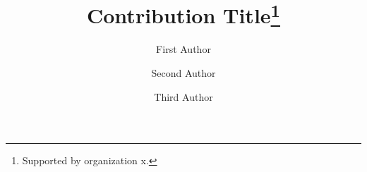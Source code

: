\documentclass[runningheads]{etc/llncs/llncs}
\begin{document}
\title{Contribution Title\thanks{Supported by organization x.}}

\author{
  First Author
\and
  Second Author
\and
  Third Author
}


\maketitle %
\nocite{*} %










\end{document}
